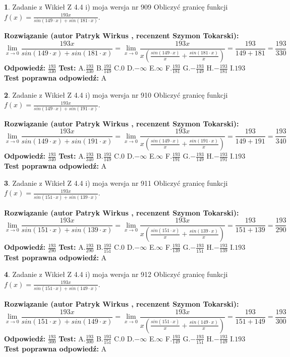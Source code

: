 \documentclass[12pt, a4paper]{article}
\theoremstyle{definition} %
\newtheorem{zad}{}
\newcommand{\zadStart}[1]{\begin{zad}#1\newline}
\newcommand{\zadStop}{\end{zad}}
\newcommand{\rozwStart}[2]{\noindent \textbf{Rozwiązanie (autor #1 , recenzent #2): }\newline}
\newcommand{\rozwStop}{\newline}
\newcommand{\odpStart}{\noindent \textbf{Odpowiedź:}\newline}
\newcommand{\odpStop}{\newline}
\newcommand{\testStart}{\noindent \textbf{Test:}\newline}
\newcommand{\testStop}{\newline}
\newcommand{\kluczStart}{\noindent \textbf{Test poprawna odpowiedź:}\newline}
\newcommand{\kluczStop}{\newline}
\begin{document}
\zadStart{Zadanie z Wikieł Z 4.4 i) moja wersja nr 909}
Obliczyć granicę funkcji $f(x)=\frac{193x}{sin(149\cdot x) +sin(181\cdot x)}$.
\zadStop
\rozwStart{Patryk Wirkus}{Szymon Tokarski}
$$\lim\limits_{x\to 0}\frac{193x}{sin(149\cdot x) +sin(181\cdot x)}=\lim\limits_{x\to 0}\frac{193x}{x(\frac{sin(149\cdot x)}{x}+\frac{sin(181\cdot x)}{x})}=\frac{193}{149+181} = \frac{193}{330}$$
\rozwStop
\odpStart
$\frac{193}{330}$
\odpStop
\testStart
A.$\frac{193}{330}$
B.$\frac{193}{149}$
C.$0$
D.$-\infty$
E.$\infty$
F.$\frac{193}{181}$
G.$-\frac{193}{149}$
H.$-\frac{193}{181}$
I.$193$
\testStop
\kluczStart
A
\kluczStop



\zadStart{Zadanie z Wikieł Z 4.4 i) moja wersja nr 910}
Obliczyć granicę funkcji $f(x)=\frac{193x}{sin(149\cdot x) +sin(191\cdot x)}$.
\zadStop
\rozwStart{Patryk Wirkus}{Szymon Tokarski}
$$\lim\limits_{x\to 0}\frac{193x}{sin(149\cdot x) +sin(191\cdot x)}=\lim\limits_{x\to 0}\frac{193x}{x(\frac{sin(149\cdot x)}{x}+\frac{sin(191\cdot x)}{x})}=\frac{193}{149+191} = \frac{193}{340}$$
\rozwStop
\odpStart
$\frac{193}{340}$
\odpStop
\testStart
A.$\frac{193}{340}$
B.$\frac{193}{149}$
C.$0$
D.$-\infty$
E.$\infty$
F.$\frac{193}{191}$
G.$-\frac{193}{149}$
H.$-\frac{193}{191}$
I.$193$
\testStop
\kluczStart
A
\kluczStop



\zadStart{Zadanie z Wikieł Z 4.4 i) moja wersja nr 911}
Obliczyć granicę funkcji $f(x)=\frac{193x}{sin(151\cdot x) +sin(139\cdot x)}$.
\zadStop
\rozwStart{Patryk Wirkus}{Szymon Tokarski}
$$\lim\limits_{x\to 0}\frac{193x}{sin(151\cdot x) +sin(139\cdot x)}=\lim\limits_{x\to 0}\frac{193x}{x(\frac{sin(151\cdot x)}{x}+\frac{sin(139\cdot x)}{x})}=\frac{193}{151+139} = \frac{193}{290}$$
\rozwStop
\odpStart
$\frac{193}{290}$
\odpStop
\testStart
A.$\frac{193}{290}$
B.$\frac{193}{151}$
C.$0$
D.$-\infty$
E.$\infty$
F.$\frac{193}{139}$
G.$-\frac{193}{151}$
H.$-\frac{193}{139}$
I.$193$
\testStop
\kluczStart
A
\kluczStop



\zadStart{Zadanie z Wikieł Z 4.4 i) moja wersja nr 912}
Obliczyć granicę funkcji $f(x)=\frac{193x}{sin(151\cdot x) +sin(149\cdot x)}$.
\zadStop
\rozwStart{Patryk Wirkus}{Szymon Tokarski}
$$\lim\limits_{x\to 0}\frac{193x}{sin(151\cdot x) +sin(149\cdot x)}=\lim\limits_{x\to 0}\frac{193x}{x(\frac{sin(151\cdot x)}{x}+\frac{sin(149\cdot x)}{x})}=\frac{193}{151+149} = \frac{193}{300}$$
\rozwStop
\odpStart
$\frac{193}{300}$
\odpStop
\testStart
A.$\frac{193}{300}$
B.$\frac{193}{151}$
C.$0$
D.$-\infty$
E.$\infty$
F.$\frac{193}{149}$
G.$-\frac{193}{151}$
H.$-\frac{193}{149}$
I.$193$
\testStop
\kluczStart
A
\kluczStop
\end{document}
